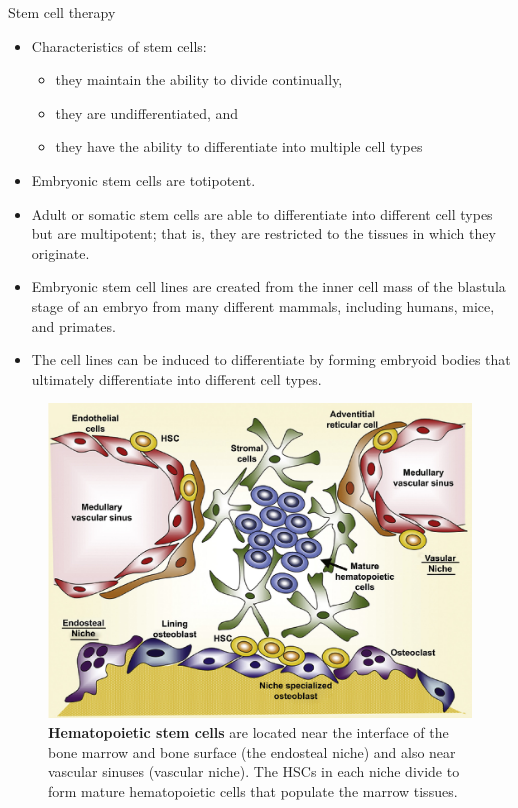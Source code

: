 \documentclass[
  ignorenonframetext,
  aspectratio=169]{beamer}
\providecommand{\tightlist}{%
  \setlength{\itemsep}{0pt}\setlength{\parskip}{0pt}}
\begin{document}
\begin{frame}{Stem cell therapy}
\protect\hypertarget{stem-cell-therapy}{}
\begin{itemize}
\tightlist
\item
  Characteristics of stem cells:

  \begin{itemize}
  \tightlist
  \item
    they maintain the ability to divide continually,
  \item
    they are undifferentiated, and
  \item
    they have the ability to differentiate into multiple cell types
  \end{itemize}
\item
  Embryonic stem cells are totipotent.
\item
  Adult or somatic stem cells are able to differentiate into different
  cell types but are multipotent; that is, they are restricted to the
  tissues in which they originate.
\item
  Embryonic stem cell lines are created from the inner cell mass of the
  blastula stage of an embryo from many different mammals, including
  humans, mice, and primates.
\item
  The cell lines can be induced to differentiate by forming embryoid
  bodies that ultimately differentiate into different cell types.
\end{itemize}
\end{frame}

\begin{frame}{}
\protect\hypertarget{section-5}{}
\begin{figure}
\includegraphics[width=0.45\linewidth]{../images/hematopoietic_stem_cells} \caption{\textbf{Hematopoietic stem cells} are located near the interface of the bone marrow and bone surface (the endosteal niche) and also near vascular sinuses (vascular niche). The HSCs in each niche divide to form mature hematopoietic cells that populate the marrow tissues.}\label{fig:stem-cell-therapy}
\end{figure}
\end{frame}
\end{document}
